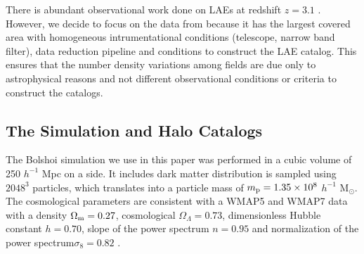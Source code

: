 \documentclass[usenatbib]{mn2e}
\begin{document}
There is abundant observational work done on LAEs at redshift $z=3.1$
\citep{Kudritzki2000,Matsuda2005,Gawiser2007,Nilsson2007,Ouchi2008}.
However, we decide to focus on the data from \cite{Yamada2012} because
it has the largest covered area with homogeneous intrumentational
conditions (telescope, narrow band filter), data reduction pipeline
and conditions to construct the LAE catalog. This ensures that the
number density variations among fields are due only to
astrophysical reasons and not different observational conditions or
criteria to construct the catalogs.


 



\subsection{The Simulation and Halo Catalogs}

The Bolshoi simulation \citep{Bolshoi} we use in this paper was
performed in a cubic volume of 250 $h^{-1}$ Mpc on a side. It includes
dark matter distribution is sampled using $2048^{3}$ particles, which
translates into a particle mass of $m_{\rm   p}=1.35\times 10^{8}$
$h^{-1}$ M$_{\odot}$.  The cosmological parameters are consistent with
a WMAP5 and WMAP7 data with a  density $\Omega_{\rm m} = 0.27$,
cosmological  $\Omega_{\Lambda}=0.73$, dimensionless Hubble constant
$h=0.70$, slope of the power spectrum $n=0.95$ and normalization of the
power spectrum$\sigma_{8}=0.82$ \citep{Komatsu2009,Jarosik2011}.  
\end{document}

